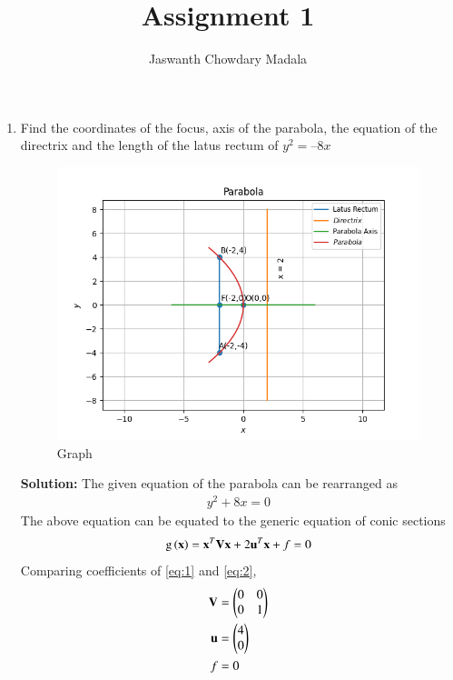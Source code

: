 \documentclass[journal,12pt,twocolumn]{IEEEtran}
\begin{document}
\vspace{3cm}


\title{Assignment 1}
\author{Jaswanth Chowdary Madala}





\maketitle

\newpage


\bigskip

\renewcommand{\thefigure}{\theenumi}
\renewcommand{\thetable}{\theenumi}


\begin{enumerate}
\item Find the coordinates of the focus, axis of the
parabola, the equation of the directrix and the length of the latus rectum of $y^2 = –8x$
\begin{figure}[ht]
\centering
\includegraphics[width = \columnwidth]{"./figs/fig.png"}
\caption{Graph}
\label{fig:1}
\end{figure}

\textbf{Solution:}
The given equation of the parabola can be rearranged as
\begin{align}
y^2+8x = 0
\label{eq:1}
\end{align}
The above equation can be equated to the generic equation of conic sections
\begin{align}
\text{g}\left(\mathbf{x}\right) = \mathbf{x}^T\mathbf{V}\mathbf{x} + 2\mathbf{u}^T\mathbf{x} + f = 0
\label{eq:2} 
\end{align}
Comparing coefficients of \eqref{eq:1} and \eqref{eq:2},
\begin{align}
\mathbf{V} &= \begin{pmatrix} 0 & 0 \\ 0 & 1\end{pmatrix} 
\label{eq:3}\\
\mathbf{u} &= \begin{pmatrix}4 \\ 0\end{pmatrix} \\
f &= 0 
\end{align}


\end{enumerate}
\end{document}
